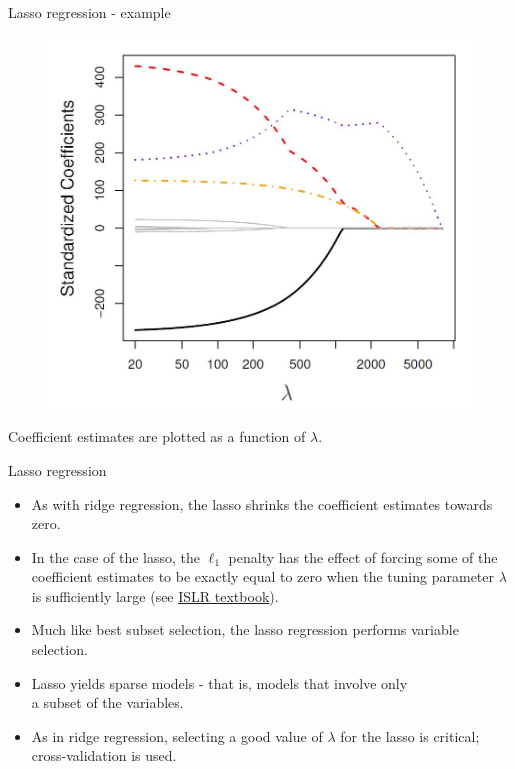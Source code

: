\documentclass{beamer}
\begin{document}
\begin{frame}{Lasso regression - example}
\vspace{-1cm}
\begin{figure}
\includegraphics[scale=0.30]{IMG/Lasso.jpg}
\end{figure}
\vspace{-0.5cm}
\centering Coefficient estimates are plotted as a function of $\lambda$.
\end{frame}
\begin{frame}{Lasso regression}
\begin{itemize}
\item As with ridge regression, the lasso shrinks the coefficient
estimates towards zero.
\medskip
\item In the case of the lasso, the $\ell_1$ penalty has the
effect of forcing some of the coefficient estimates to be
exactly equal to zero when the tuning parameter $\lambda$ is
sufficiently large (see \textcolor{blue}{\underline{\href{http://www-bcf.usc.edu/~gareth/ISL/}{ISLR textbook}}}).
\medskip
\item Much like best subset selection, the lasso regression performs
variable selection.
\medskip
\item Lasso yields sparse models - that is, models that involve only \\a subset of the variables.
\medskip
\item As in ridge regression, selecting a good value of $\lambda$ for the
lasso is critical; cross-validation is used.
\end{itemize}
\end{frame}
\end{document}
